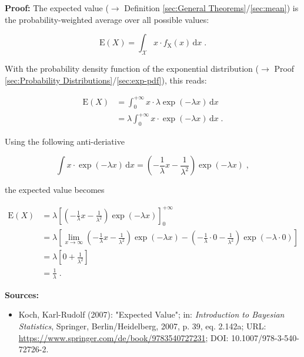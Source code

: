 \documentclass[a4paper,12pt,twoside]{book}
\begin{document}
\vspace{1em}
\textbf{Proof:} The expected value ($\rightarrow$ Definition \ref{sec:General Theorems}/\ref{sec:mean}) is the probability-weighted average over all possible values:

\begin{equation} \label{eq:exp-mean-mean}
\mathrm{E}(X) = \int_{\mathcal{X}} x \cdot f_\mathrm{X}(x) \, \mathrm{d}x \; .
\end{equation}

With the probability density function of the exponential distribution ($\rightarrow$ Proof \ref{sec:Probability Distributions}/\ref{sec:exp-pdf}), this reads:

\begin{equation} \label{eq:exp-mean-exp-mean-s1}
\begin{split}
\mathrm{E}(X) &= \int_{0}^{+\infty} x \cdot \lambda \exp(-\lambda x) \, \mathrm{d}x \\
&= \lambda \int_{0}^{+\infty} x \cdot \exp(-\lambda x) \, \mathrm{d}x \; .
\end{split}
\end{equation}

Using the following anti-deriative

\begin{equation} \label{eq:exp-mean-exp-mean-s2}
\int x \cdot \exp(-\lambda x) \, \mathrm{d}x = \left( - \frac{1}{\lambda} x - \frac{1}{\lambda^2} \right) \exp(-\lambda x) \; ,
\end{equation}

the expected value becomes

\begin{equation} \label{eq:exp-mean-exp-mean-s3}
\begin{split}
\mathrm{E}(X) &= \lambda \left[ \left( - \frac{1}{\lambda} x - \frac{1}{\lambda^2} \right) \exp(-\lambda x) \right]_{0}^{+\infty} \\
&= \lambda \left[ \lim_{x \to \infty} \left( - \frac{1}{\lambda} x - \frac{1}{\lambda^2} \right) \exp(-\lambda x) - \left( - \frac{1}{\lambda} \cdot 0 - \frac{1}{\lambda^2} \right) \exp(-\lambda \cdot 0) \right] \\
&= \lambda \left[ 0 + \frac{1}{\lambda^2} \right] \\
&= \frac{1}{\lambda} \; .
\end{split}
\end{equation}


\vspace{1em}
\textbf{Sources:}
\begin{itemize}
\item Koch, Karl-Rudolf (2007): "Expected Value"; in: \textit{Introduction to Bayesian Statistics}, Springer, Berlin/Heidelberg, 2007, p. 39, eq. 2.142a; URL: \url{https://www.springer.com/de/book/9783540727231}; DOI: 10.1007/978-3-540-72726-2.
\end{itemize}
\end{document}
